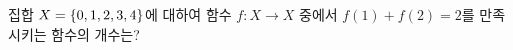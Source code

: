 집합 $X=\{0{,}\mkern3mu\mathopen{}1{,}\mkern3mu\mathopen{}2{,}\mkern3mu\mathopen{}3{,}\mkern3mu\mathopen{}4\}$에 대하여 함수 $f:X\longrightarrow X$ 중에서 $f(1)+f(2)=2$를 만족시키는 함수의 개수는?
